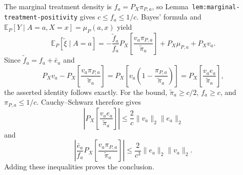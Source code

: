 The marginal treatment density is \(f_a=P_X\pi_{P,a}\), so Lemma~\texttt{lem:marginal-treatment-positivity} gives \(c\le f_a\le1/c\). Bayes' formula and \(\mathbb E_P[Y\mid A=a,X=x]=\mu_P(a,x)\) yield
\[
\mathbb E_P[\widetilde\xi\mid A=a]
=-\frac{\widetilde f_a}{f_a}P_X\!\left[\frac{v_a\pi_{P,a}}{\widetilde\pi_a}\right]+P_X\mu_{P,a}+P_Xv_a.
\]
Since \(\widetilde f_a=f_a+\bar e_a\) and
\[
P_Xv_a-P_X\!\left[\frac{v_a\pi_{P,a}}{\widetilde\pi_a}\right]
=P_X\!\left[v_a\left(1-\frac{\pi_{P,a}}{\widetilde\pi_a}\right)\right]
=P_X\!\left[\frac{v_ae_a}{\widetilde\pi_a}\right],
\]
the asserted identity follows exactly. For the bound, \(\widetilde\pi_a\ge c/2\), \(f_a\ge c\), and \(\pi_{P,a}\le1/c\). Cauchy--Schwarz therefore gives
\[
\left|P_X\!\left[\frac{v_ae_a}{\widetilde\pi_a}\right]\right|
\le\frac2c\|v_a\|_2\|e_a\|_2
\]
and
\[
\left|\frac{\bar e_a}{f_a}P_X\!\left[\frac{v_a\pi_{P,a}}{\widetilde\pi_a}\right]\right|
\le\frac{2}{c^3}\|e_a\|_2\|v_a\|_2.
\]
Adding these inequalities proves the conclusion.